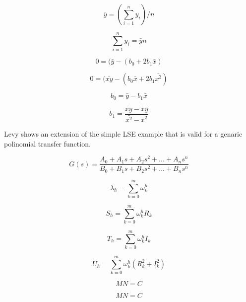 \begin{equation}
\bar{y} = (\sum_{i=1}^{n} y_i) / n
\end{equation}

\begin{equation}
\sum_{i=1}^{n} y_i  = \bar{y}n
\end{equation}

\begin{equation}
0 = (\bar{y} - (b_0 + 2b_1 \bar{x})
\end{equation}

\begin{equation}
0 = (\bar{xy} - (b_0 \bar{x} + 2b_1 \bar{x^2})
\end{equation}

\begin{equation}
b_0 = \bar{y} - b_1 \bar{x}
\end{equation}

\begin{equation}
b_1 = \frac{\bar{xy} - \bar{x}\bar{y}}{\bar{x^2} - \bar{x}^2}
\end{equation}


Levy shows an extension of the simple LSE example that is valid for a genaric polinomial transfer function.

\begin{equation}
G(s) = \frac{A_0 + A_1 s + A_2 s^2 + ... + A_n s^n}{B_0 + B_1 s + B_2 s^2 + ... + B_n s^n}
\end{equation}

\begin{equation}
\lambda _h = \sum_{k=0}^{m} \omega _k ^h
\end{equation}

\begin{equation}
S_h = \sum_{k=0}^{m} \omega _k ^h R_k
\end{equation}

\begin{equation}
T_h = \sum_{k=0}^{m} \omega _k ^h I_k
\end{equation}

\begin{equation}
U_h = \sum_{k=0}^{m} \omega _k ^h (R_k ^2 + I_k ^2)
\end{equation}

\begin{equation}
MN = C
\end{equation}

\begin{equation}
MN = C
\end{equation}

